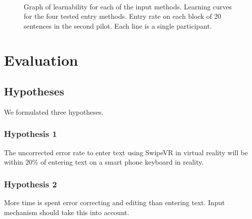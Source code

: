 \documentclass{sigchi}
\begin{document}
\begin{figure}
\centering



\caption{
Graph of learnability for each of the input methods.
Learning curves for the four tested entry methods.
Entry rate on each block of 20 sentences in the second pilot.
Each line is a single participant.
}~\label{fig:learnability}
\end{figure}


\section{Evaluation}


\subsection{Hypotheses}
We formulated three hypotheses.

\subsubsection{Hypothesis 1}
The uncorrected error rate to enter text using SwipeVR in virtual reality will be within 20\% of entering text on a smart phone keyboard in reality.

\subsubsection{Hypothesis 2}
More time is spent error correcting and editing than entering text.  Input mechanism should take this into account.
\end{document}
